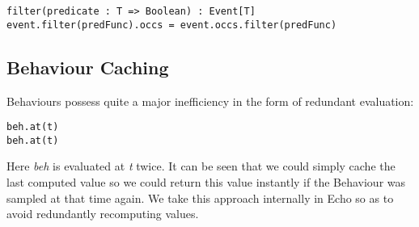 \begin{verbatim}
filter(predicate : T => Boolean) : Event[T]
event.filter(predFunc).occs = event.occs.filter(predFunc)
\end{verbatim}  

    \subsection{Behaviour Caching}
      Behaviours possess quite a major inefficiency in the form of redundant evaluation:

\begin{verbatim}
beh.at(t)
beh.at(t)
\end{verbatim}  

      Here \emph{beh} is evaluated at \emph{t} twice. It can be seen that we could simply cache the last
      computed value so we could return this value instantly if the Behaviour was sampled at that time again.
      We take this approach internally in Echo so as to avoid redundantly recomputing values. 